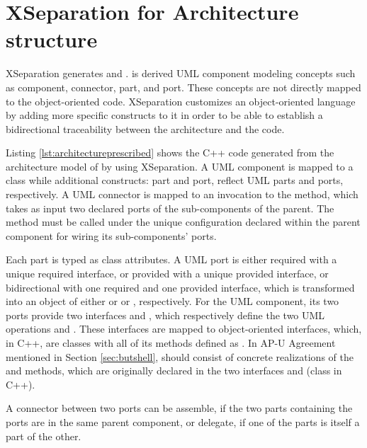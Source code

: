 \section{XSeparation for Architecture structure}
\label{sec:xseparationarchitecture}
XSeparation generates  and .
 is derived UML component modeling concepts such as component, connector, part, and port.
These concepts are not directly mapped to the object-oriented code.
XSeparation customizes an object-oriented language by adding more specific constructs to it in order to be able to establish a bidirectional traceability between the architecture and the code.

Listing \ref{lst:architectureprescribed} shows the C++ code generated from the architecture model of  by using XSeparation.
A UML component is mapped to a class while additional constructs: part and port, reflect UML parts and ports, respectively.
A UML connector is mapped to an invocation to the  method, which takes as input two declared ports of the sub-components of the parent.
The  method must be called under the unique configuration declared within the parent component for wiring its sub-components' ports.







Each part is typed as class attributes.
A UML port is either required with a unique required interface, or provided with a unique provided interface, or bidirectional with one required and one provided interface, which is transformed into an object of either  or  or , respectively.
For the UML  component, its two ports provide two interfaces  and , which respectively define the two UML operations  and .
These interfaces are mapped to object-oriented interfaces, which, in C++, are classes with all of its methods defined as .
In AP-U Agreement mentioned in Section \ref{sec:butshell},  should consist of concrete realizations of the  and  methods, which are originally declared in the two interfaces  and  (class in C++).

A connector between two ports can be assemble, if the two parts containing the ports are in the same parent component, or delegate, if one of the parts is itself a part of the other.


